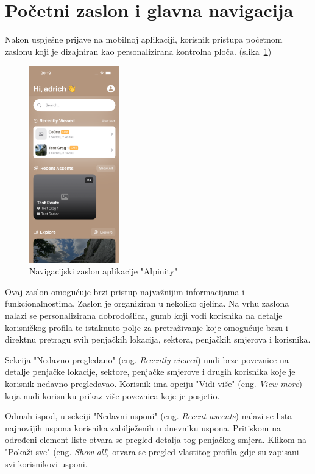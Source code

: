 \section{Početni zaslon i glavna navigacija}

Nakon uspješne prijave na mobilnoj aplikaciji, korisnik pristupa početnom zaslonu koji je dizajniran kao personalizirana kontrolna ploča. (slika~\ref{fig:početni_zaslon})

\begin{figure}[H]
    \centering
    \includegraphics[width=0.35\textwidth]{images/implementacija/main_nav_1.png}
    \caption{Navigacijski zaslon aplikacije "Alpinity"}
    \label{fig:početni_zaslon}
\end{figure}

Ovaj zaslon omogućuje brzi pristup najvažnijim informacijama i funkcionalnostima. Zaslon je organiziran u nekoliko cjelina. Na vrhu zaslona nalazi se personalizirana dobrodošlica, gumb koji vodi korisnika na detalje korisničkog profila te istaknuto polje za pretraživanje koje omogućuje brzu i direktnu pretragu svih penjačkih lokacija, sektora, penjačkih smjerova i korisnika.

Sekcija "Nedavno pregledano" (eng. \textit{Recently viewed}) nudi brze poveznice na detalje penjačke lokacije, sektore, penjačke smjerove i drugih korisnika koje je korisnik nedavno pregledavao. Korisnik ima opciju "Vidi više" (eng. \textit{View more}) koja nudi korisniku prikaz više poveznica koje je posjetio.

Odmah ispod, u sekciji "Nedavni usponi" (eng. \textit{Recent ascents}) nalazi se lista najnovijih uspona korisnika zabilježenih u dnevniku uspona. Pritiskom na određeni element liste otvara se pregled detalja tog penjačkog smjera. Klikom na "Pokaži sve" (eng. \textit{Show all}) otvara se pregled vlastitog profila gdje su zapisani svi korisnikovi usponi. 

